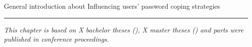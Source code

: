 General introduction about Influencing users' password coping strategies

\vspace{10pt}

\noindent\rule{0.38\textwidth}{0.5pt}

\textit{This chapter is based on X bachelor theses (\todo ), X master theses (\todo ) and parts were published in conference proceedings. \cite{Seitz2017Emojipasswords}}